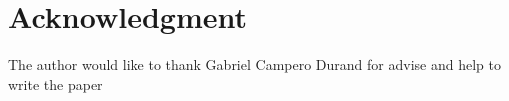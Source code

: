 \documentclass[conference]{IEEEtran}
\begin{document}
\section*{Acknowledgment}
The author would like to thank Gabriel Campero Durand for advise and help to write the paper







\end{document}
